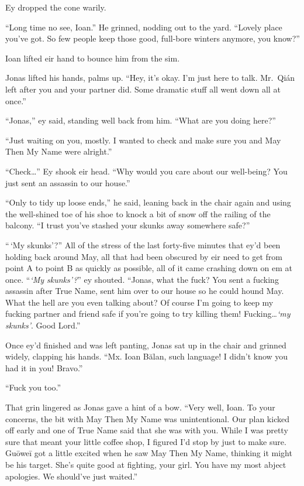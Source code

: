 Ey dropped the cone warily.

``Long time no see, Ioan.'' He grinned, nodding out to the yard. ``Lovely place you've got. So few people keep those good, full-bore winters anymore, you know?''

Ioan lifted eir hand to bounce him from the sim.

Jonas lifted his hands, palms up. ``Hey, it's okay. I'm just here to talk. Mr.~Qián left after you and your partner did. Some dramatic stuff all went down all at once.''

``Jonas,'' ey said, standing well back from him. ``What are you doing here?''

``Just waiting on you, mostly. I wanted to check and make sure you and May Then My Name were alright.''

``Check\ldots{}'' Ey shook eir head. ``Why would you care about our well-being? You just sent an assassin to our house.''

``Only to tidy up loose ends,'' he said, leaning back in the chair again and using the well-shined toe of his shoe to knock a bit of snow off the railing of the balcony. ``I trust you've stashed your skunks away somewhere safe?''

``\,`My skunks'?'' All of the stress of the last forty-five minutes that ey'd been holding back around May, all that had been obscured by eir need to get from point A to point B as quickly as possible, all of it came crashing down on em at once. ``\emph{`My skunks'?}'' ey shouted. ``Jonas, what the fuck? You sent a fucking assassin after True Name, sent him over to our house so he could hound May. What the hell are you even talking about? Of course I'm going to keep my fucking partner and friend safe if you're going to try killing them! Fucking\ldots{}\emph{`my skunks'}. Good Lord.''

Once ey'd finished and was left panting, Jonas sat up in the chair and grinned widely, clapping his hands. ``Mx. Ioan Bălan, such language! I didn't know you had it in you! Bravo.''

``Fuck you too.''

That grin lingered as Jonas gave a hint of a bow. ``Very well, Ioan. To your concerns, the bit with May Then My Name was unintentional. Our plan kicked off early and one of True Name said that she was with you. While I was pretty sure that meant your little coffee shop, I figured I'd stop by just to make sure. Guōweī got a little excited when he saw May Then My Name, thinking it might be his target. She's quite good at fighting, your girl. You have my most abject apologies. We should've just waited.''


